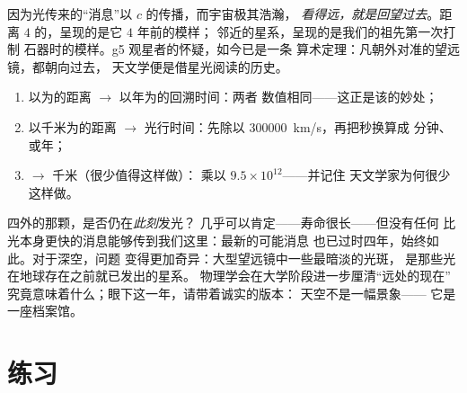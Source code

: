 \begin{proposition}[望远镜是时光机器]\label{prop:g8:speed-of-light:timemachine}
因为光传来的“消息”以 $c$ 的传播，而宇宙极其浩瀚，
\emph{看得远，就是回望过去}。距离 $4$
的，呈现的是它 $4$ 年前的模样；
邻近的星系，呈现的是我们的祖先第一次打制
石器时的模样。g5 观星者的怀疑，如今已是一条
算术定理：凡朝外对准的望远镜，都朝向过去，
天文学便是借星光阅读的历史。
\end{proposition}

\begin{method}[距离与回溯时间的换算]\label{met:g8:speed-of-light:convert}
\begin{enumerate}
  \item 以为的距离 $\to$ 以年为的回溯时间：两者
        数值相同——这正是该的妙处；
  \item 以千米为的距离 $\to$ 光行时间：先除以
        \qty{300000}{km/s}，再把秒换算成
        分钟、或年；
  \item {} $\to$ 千米（很少值得这样做）：
        乘以 $9.5 \times 10^{12}$——并记住
        天文学家为何很少这样做。
\end{enumerate}
\end{method}

\begin{remark}\label{rem:g8:speed-of-light:now}
四外的那颗，是否仍在\emph{此刻}发光？
几乎可以肯定——寿命很长——但没有任何
比光本身更快的消息能够传到我们这里：最新的可能消息
也已过时四年，始终如此。对于深空，问题
变得更加奇异：大型望远镜中一些最暗淡的光斑，
是那些光在地球存在之前就已发出的星系。
物理学会在大学阶段进一步厘清“远处的现在”
究竟意味着什么；眼下这一年，请带着诚实的版本：
天空不是一幅景象——
它是一座档案馆。
\end{remark}

\section{练习}

